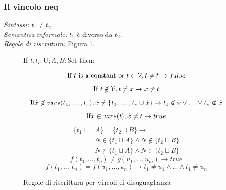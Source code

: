 \documentclass[12pt,a4paper,openright]{book}  %
\begin{document}
\subsubsection{Il vincolo neq}

\textit{Sintassi:} $t_1 \neq t_2$.\\
\noindent\textit{Semantica informale:} $t_1$ è diverso da $t_2$.\\
\noindent\textit{Regole di riscrittura:} Figura \ref{fig:neq_constraints}.

\begin{figure}
	\begin{tcolorbox}[colframe=black, colback=white, sharp corners]
		\setcounter{equation}{0}
		\renewcommand{\theequation}{$\neq$\textsubscript{\arabic{equation}}}

		If $t, t_i: \text{U}; A,B: \text{Set}$ then:

		\begin{equation}
		\text{If } t \text{ is a constant or } t \in \mathcal{V}, t \neq t \to false
		\end{equation}
		\begin{equation}
		\text{If } t \not\in \mathcal{V}, t \neq \dot{x} \to \dot{x} \neq t
		\end{equation}
		\begin{equation}
		\text{If} \dot{x} \not\in vars(t_1, \ldots, t_n), \dot{x} \neq \{ t_1, \ldots, t_n \sqcup \dot{x} \} \to t_1 \not\in \dot{x} \lor \ldots \lor t_n \not\in \dot{x}
		\end{equation}
		\begin{equation}
		\text{If} \dot{x} \in vars(t), \dot{x} \neq t \to true
		\end{equation}
		\begin{equation}
		\begin{split}
		\{ t_1 \sqcup & A \} = \{ t_2 \sqcup B \} \to \\
		& N \in \{ t_1 \sqcup A \} \land N \not\in \{ t_2 \sqcup B \} \\
		& N \not\in \{ t_1 \sqcup A \} \land N \in \{ t_2 \sqcup B \}
		\end{split}
		\end{equation}
		\begin{equation}
		f(t_1, \ldots, t_n) \neq g(u_1, \ldots, u_m) \to true
		\end{equation}
		\begin{equation}
		f(t_1, \ldots, t_n) = f(u_1, \ldots, u_n) \to t_1 \neq u_1 \land \ldots \land t_1 \neq u_n
		\end{equation}

	\end{tcolorbox}

	\caption{Regole di riscrittura per vincoli di disuguaglianza}
	\label{fig:neq_constraints}
\end{figure}
\end{document}
